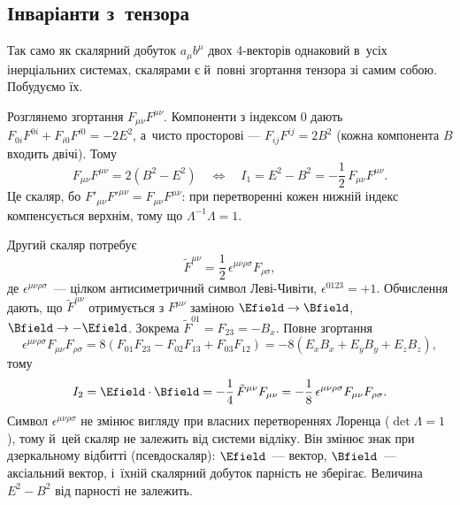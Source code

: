\begin{Extra}
\subsection*{Інваріанти з~тензора}

Так само як скалярний добуток $a_\mu b^\mu$ двох 4-векторів однаковий в~усіх інерціальних
системах, скалярами є й~повні згортання тензора зі самим собою. Побудуємо їх.

 Розглянемо згортання $F_{\mu\nu}F^{\mu\nu}$. Компоненти з
індексом $0$ дають $F_{0i}F^{0i} + F_{i0}F^{i0} = -2E^2$, а~чисто просторові ---
$F_{ij}F^{ij} = 2B^2$ (кожна компонента $B$ входить двічі). Тому
\begin{equation}\label{eq:I1Tensor}
	F_{\mu\nu}F^{\mu\nu} = 2\left(B^2 - E^2\right)
	\quad\Longleftrightarrow\quad I_1 = E^2 - B^2 = -\frac12\,F_{\mu\nu}F^{\mu\nu}.
\end{equation}
Це скаляр, бо $F'_{\mu\nu}F'^{\mu\nu} = F_{\mu\nu}F^{\mu\nu}$: при перетворенні кожен
нижній індекс компенсується верхнім, тому що $\Lambda^{-1}\Lambda = 1$.

 Другий скаляр потребує 
\begin{equation*}
	\tilde F^{\mu\nu} = \frac12\,\epsilon^{\mu\nu\rho\sigma}F_{\rho\sigma},
\end{equation*}
де $\epsilon^{\mu\nu\rho\sigma}$~--- цілком антисиметричний символ Леві-Чивіти,
$\epsilon^{0123} = +1$. Обчислення дають, що $\tilde F^{\mu\nu}$ отримується з
$F^{\mu\nu}$ заміною $\Efield \to \Bfield$, $\Bfield \to -\Efield$. Зокрема $\tilde F^{01}
= F_{23} = -B_x$. Повне згортання
\begin{equation*}
	\epsilon^{\mu\nu\rho\sigma}F_{\mu\nu}F_{\rho\sigma} = 8\left(F_{01}F_{23} -
	F_{02}F_{13} + F_{03}F_{12}\right) = -8\left(E_xB_x + E_yB_y + E_zB_z\right),
\end{equation*}
тому
\begin{equation}\label{eq:I2Tensor}
	I_2 = \Efield\cdot\Bfield = -\frac14\,\tilde F^{\mu\nu}F_{\mu\nu} =
	-\frac18\,\epsilon^{\mu\nu\rho\sigma}F_{\mu\nu}F_{\rho\sigma}.
\end{equation}
Символ $\epsilon^{\mu\nu\rho\sigma}$ не змінює вигляду при власних перетвореннях Лоренца
($\det\Lambda = 1$), тому й~цей скаляр не залежить від системи відліку. Він змінює знак
при дзеркальному відбитті (псевдоскаляр): $\Efield$~--- вектор, $\Bfield$~--- аксіальний
вектор, і~їхній скалярний добуток парність не зберігає. Величина $E^2 - B^2$ від парності
не залежить.


\end{Extra}
